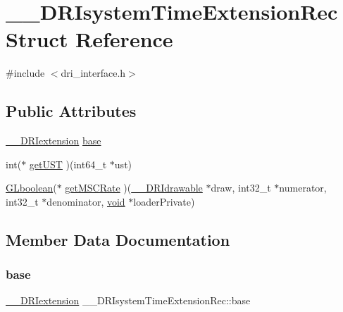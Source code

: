 \hypertarget{struct_____d_r_isystem_time_extension_rec}{}\section{\+\_\+\+\_\+\+D\+R\+Isystem\+Time\+Extension\+Rec Struct Reference}
\label{struct_____d_r_isystem_time_extension_rec}


{\ttfamily \#include $<$dri\+\_\+interface.\+h$>$}

\subsection*{Public Attributes}
\begin{DoxyCompactItemize}
\item 
\hyperlink{dri__interface_8h_a4e0a61c8ece00d2b2c6792a9a1b55385}{\+\_\+\+\_\+\+D\+R\+Iextension} \hyperlink{struct_____d_r_isystem_time_extension_rec_a973aab16eb6c4fe9ed24d1dc27010fa4}{base}
\item 
int($\ast$ \hyperlink{struct_____d_r_isystem_time_extension_rec_a18da279203679b19649a8635242d2dbf}{get\+U\+ST} )(int64\+\_\+t $\ast$ust)
\item 
\hyperlink{gl_8h_aea1419aa8aec5854bd9807b45171029d}{G\+Lboolean}($\ast$ \hyperlink{struct_____d_r_isystem_time_extension_rec_a67ced019fa1514882ab8b918185a9af8}{get\+M\+S\+C\+Rate} )(\hyperlink{dri__interface_8h_a5bfb832a0a08208d95b3bbef439d2262}{\+\_\+\+\_\+\+D\+R\+Idrawable} $\ast$draw, int32\+\_\+t $\ast$numerator, int32\+\_\+t $\ast$denominator, \hyperlink{_s_d_l__opengles2__gl2ext_8h_ae5d8fa23ad07c48bb609509eae494c95}{void} $\ast$loader\+Private)
\end{DoxyCompactItemize}


\subsection{Member Data Documentation}
\mbox{\label{struct_____d_r_isystem_time_extension_rec_a973aab16eb6c4fe9ed24d1dc27010fa4}} 
\subsubsection{\texorpdfstring{base}{base}}
{\footnotesize\ttfamily \hyperlink{dri__interface_8h_a4e0a61c8ece00d2b2c6792a9a1b55385}{\+\_\+\+\_\+\+D\+R\+Iextension} \+\_\+\+\_\+\+D\+R\+Isystem\+Time\+Extension\+Rec\+::base}

